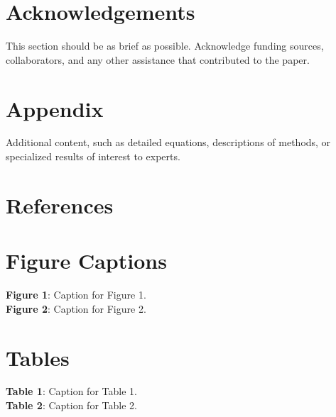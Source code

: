 \documentclass[a4paper,12pt]{article}
\begin{document}
\section*{Acknowledgements}
This section should be as brief as possible. Acknowledge funding sources, collaborators, and any other assistance that contributed to the paper.

\appendix
\section{Appendix}
Additional content, such as detailed equations, descriptions of methods, or specialized results of interest to experts.

\section*{References}


\section*{Figure Captions}
\noindent \textbf{Figure 1}: Caption for Figure 1. \\
\textbf{Figure 2}: Caption for Figure 2.

\section*{Tables}
\noindent \textbf{Table 1}: Caption for Table 1. \\
\textbf{Table 2}: Caption for Table 2.
\end{document}
